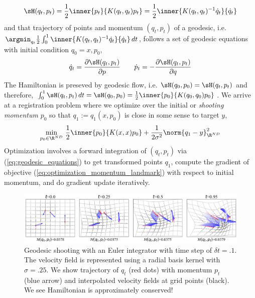 \documentclass[11pt]{article}
\begin{document}
\begin{align}
    \sH(q_t,p_t)
        = \frac{1}{2} \inner{p_t}{K(q_t,q_t)p_t}
        = \frac{1}{2} \inner{K(q_t, q_t)^{-1} \dot{q}_t}{\dot{q}_t}
\end{align}
and that trajectory of points and momentum $(q_t,p_t)$ of a geodesic, i.e. $\argmin_{q_t} \frac{1}{2}\int_0^1 \inner{K(q_t, q_t)^{-1} \dot{q}_t}{\dot{q}_t} \, dt$, follows a set of geodesic equations with initial condition $q_0 = x, p_0$,
\begin{align}
    \dot{q}_t
        = \frac{\partial \sH(q_t,p_t)}{\partial p}
    \quad\quad
    \dot{p}_t
        = - \frac{\partial \sH(q_t,p_t)}{\partial q}
    \label{eq:geodesic_equations}
\end{align}
The Hamiltonian is preseved by geodesic flow, i.e. $\sH(q_0,p_0) = \sH(q_t,p_t)$ and therefore, $\int_0^1 \sH(q_t,p_t) \, dt = \sH(q_0, p_0) = \frac{1}{2} \inner{ p_0 }{ K(q_0,q_0) p_0 }$. We arrive at a registration problem where we optimize over the initial or \textit{shooting momentum} $p_0$ so that $q_1 := q_1(x,p_0)$ is close in some sense to target $y$,
\begin{align}
    \min_{p_0\in\R^{ND}} \,
        \frac{1}{2} \inner{ p_0 }{ K(x,x) p_0 } + \frac{1}{2\sigma^2} \norm{q_1 - y}_{\R^{ND}}^2
    \label{eq:optimization_momentum_landmark}
\end{align}
Optimization involves a forward integration of $(q_t,p_t)$ via (\ref{eq:geodesic_equations}) to get transformed points $q_1$, compute the gradient of objective (\ref{eq:optimization_momentum_landmark}) with respect to initial momentum, and do gradient update iteratively.


\begin{center} 
\begin{figure}[h!]
    \includegraphics[width=\textwidth]{assets/plt_shooting} 
    \caption{Geodesic shooting with an Euler integrator with time step of $\delta t = .1$. The velocity field is represented using a radial basis kernel with $\sigma=.25$. We show trajectory of $q_t$ (red dots) with momentum $p_t$ (blue arrow) and interpolated velocity fields at grid points (black). We see Hamiltonian is approximately conserved!}
    \label{fig:plt_shooting}
\end{figure}
\end{center} 
 



\newpage
\printbibliography 
\end{document}
